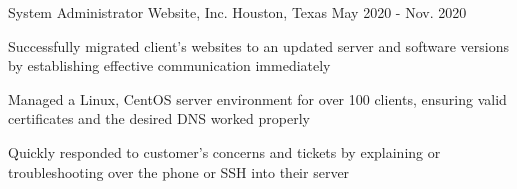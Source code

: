     \begin{cventries}

      \cventry
        {System Administrator} %
        {Website, Inc.} %
        {Houston, Texas} %
        {May 2020 - Nov. 2020} %
        {
          \begin{cvitems}
            \item {Successfully migrated client's websites to an updated server and software versions by establishing effective communication immediately}
            \item {Managed a Linux, CentOS server environment for over 100 clients, ensuring valid certificates and the desired DNS worked properly}
            \item {Quickly responded to customer's concerns and tickets by explaining or troubleshooting over the phone or SSH into their server}
          \end{cvitems}
        }
  \end{cventries}
